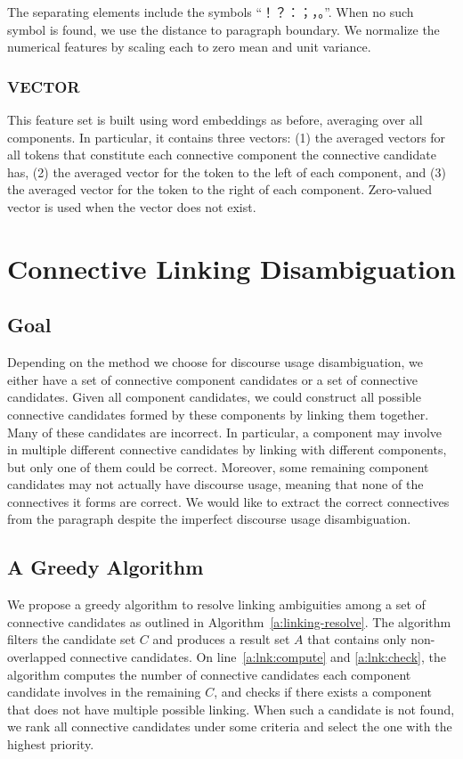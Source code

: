 The separating elements include the symbols ``！？：；，。''.
When no such symbol is found, we use the distance to paragraph boundary.
We normalize the numerical features by scaling each to zero mean and unit variance.

\subsubsection{VECTOR}

This feature set is built using word embeddings as before, averaging over all components.
In particular, it contains three vectors: (1) the averaged vectors
for all tokens that constitute each connective component the connective candidate has,
(2) the averaged vector for the
token to the left of each component, and (3) the averaged vector for the token to the
right of each component. Zero-valued vector is used when the vector does not exist.

\section{Connective Linking Disambiguation}
\label{s:linking-disambig}

\subsection{Goal}

Depending on the method we choose for discourse usage disambiguation, we
either have a set of connective component candidates or a set of connective
candidates. Given all component candidates, we could construct all possible
connective candidates formed by these components by linking them together.
Many of these candidates are incorrect. In particular, a component may involve in
multiple different connective candidates by linking with different components,
but only one of them could be correct. Moreover, some remaining component
candidates may not actually have discourse usage, meaning that none of
the connectives it forms are correct. We would like to extract the
correct connectives from the paragraph despite the imperfect discourse usage
disambiguation.

\subsection{A Greedy Algorithm}

We propose a greedy algorithm to resolve linking ambiguities among a set of
connective candidates as outlined in Algorithm~\ref{a:linking-resolve}.
The algorithm filters the candidate set $C$ and produces a result set $A$ that
contains only non-overlapped connective candidates. On line~\ref{a:lnk:compute}
and \ref{a:lnk:check}, the algorithm computes the number of connective candidates
each component candidate involves in the remaining $C$, and checks if there exists
a component that does not have multiple possible linking. When such a candidate
is not found, we rank all connective candidates under some criteria
and select the one with the highest priority.

